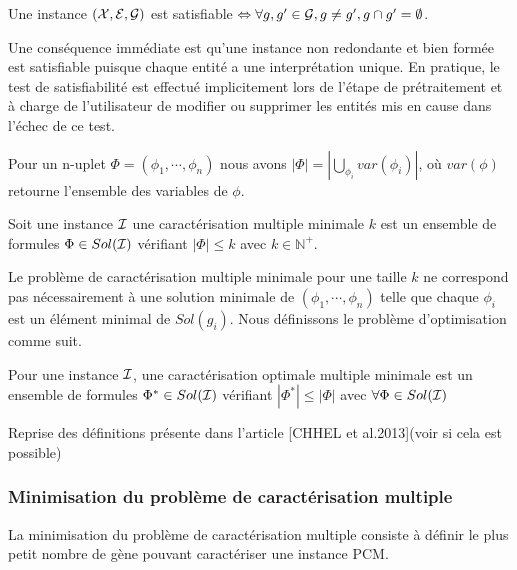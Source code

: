 \begin{proposition}
Une instance $({\cal X},{\cal E},{\cal G})$ est satisfiable $\Leftrightarrow
\forall g,g' \in {\cal G}, g\neq g', g
\cap g' =\emptyset$.
\end{proposition}

Une conséquence immédiate est qu'une instance non redondante et bien formée
est satisfiable puisque chaque entité a une interprétation unique.
En pratique, le test de satisfiabilité est effectué implicitement lors de
l'étape de prétraitement et à charge de l'utilisateur de modifier ou supprimer
les entités mis en cause dans l'échec de ce test.

\begin{definition}
\label{Flength}
Pour un n-uplet $\Phi=(\phi_1,\cdots,\phi_n)$ nous avons $|\Phi| =
|\bigcup_{\phi_i} var(\phi_{i})|$, où $var({\phi})$ retourne l'ensemble des
variables de
$\phi$.
\end{definition}

\begin{definition}
Soit une instance ${\cal I}$ une
caractérisation multiple minimale $k$ est un ensemble de formules
$\Phi \in Sol({\cal I})$ vérifiant $|\Phi| \leq k$ avec $ k\in \mathbb{N}^{+}$.
\end{definition}

Le problème de caractérisation multiple minimale pour une taille $k$ ne
correspond pas nécessairement à une solution minimale de
$(\phi_1,\cdots,\phi_n)$ telle que chaque $\phi_i$ est un élément minimal de
$Sol(g_i)$. Nous définissons le problème d'optimisation comme suit.

\begin{definition}
Pour une instance ${\cal I}$, une
caractérisation optimale multiple minimale est  un ensemble de formules
$\Phi^* \in Sol({\cal I})$ vérifiant $|\Phi^*| \leq |\Phi|$ avec $\forall \Phi
\in Sol({\cal I})$
\end{definition}

Reprise des définitions présente dans l'article [CHHEL et al.2013](voir si cela est possible)
\subsubsection*{Minimisation du problème de caractérisation multiple}
La minimisation du problème de caractérisation multiple consiste à définir le plus petit nombre de gène pouvant caractériser une instance PCM.


